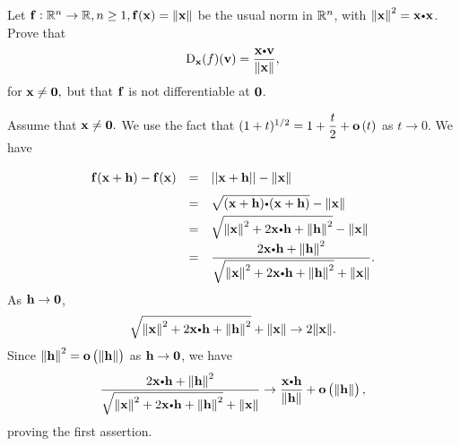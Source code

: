 \begin{multicols}{2}
\begin{problem}
\end{problem}
\begin{problem}
Let $\mathbf{ f}: \mathbb{R}^n \rightarrow \mathbb{R}, n \geq 1, \mathbf{ f}(\mathbf{ x}) =
{\left\|\mathbf{ x}\right\|}$ be the usual norm in $\mathbb{R}^n$, with
$\norm{\vector{x}}^2 = \vector{x}\bp\vector{x}$.  Prove that
$$\deriv{x}{f}(\vector{v}) = \dfrac{\vector{x}\bp\vector{v}}{\norm{\vector{x}}},  $$
for $\mathbf{ x} \neq \mathbf{ 0},$ but that $\mathbf{ f}$ is not differentiable
at $\mathbf{ 0}$. \begin{answer} Assume that $\mathbf{ x} \neq
\mathbf{ 0}.$ We use the fact that $(1 + t)^{1/2} = 1 + \dfrac{t}{2}
+ {\mathbf o}\left(t\right)$ as $t \rightarrow 0$. We have
$$\renewcommand{\arraystretch}{1.7}
{\everymath{\displaystyle}\begin{array}{lll} \funvect{f}(\vector{x} +
\vector{h}) - \funvect{f}(\vector{x}) & = & ||\vector{x}+\vector{h}|| - \norm{\vector{x}}  \\
& = & \sqrt{(\vector{x} + \vector{h})\bp (\vector{x} + \vector{h})} - \norm{\vector{x}} \\
& = & \sqrt{\norm{\vector{x}}^2 + 2\vector{x}\bp\vector{h}+
\norm{\vector{h}}^2} - \norm{\vector{x}}
\\
& = & \dfrac{2\dotprod{x}{h}+
\norm{\vector{h}}^2}{\sqrt{\norm{\vector{x}}^2 +
2\vector{x}\bp\vector{h}+ \norm{\vector{h}}^2}  + \norm{\vector{x}}}.\\
\end{array}}$$\renewcommand{\arraystretch}{1}
As $\mathbf{ h} \rightarrow \mathbf{ 0}$,
$$\sqrt{\norm{\vector{x}}^2 +
2\vector{x}\bp\vector{h}+ \norm{\vector{h}}^2}  + \norm{\vector{x}}
\rightarrow 2\norm{\vector{x}}.$$Since ${\left\|\mathbf{ h}\right\|}^2 =
{\mathbf o}\left({\left\|\mathbf{ h}\right\|}\right)$ as $\mathbf{ h} \rightarrow
\mathbf{ 0}$, we have
$$\dfrac{2\dotprod{x}{h}+ \norm{\vector{h}}^2}{\sqrt{\norm{\vector{x}}^2 +
2\vector{x}\bp\vector{h}+ \norm{\vector{h}}^2}  + \norm{\vector{x}}}
\rightarrow \dfrac{\vector{x}\bp\vector{h}}{\norm{\vector{h}}} +
\smallosans{\norm{\vector{h}}},$$proving the first assertion.




\end{answer}
\end{problem}
\end{multicols}
